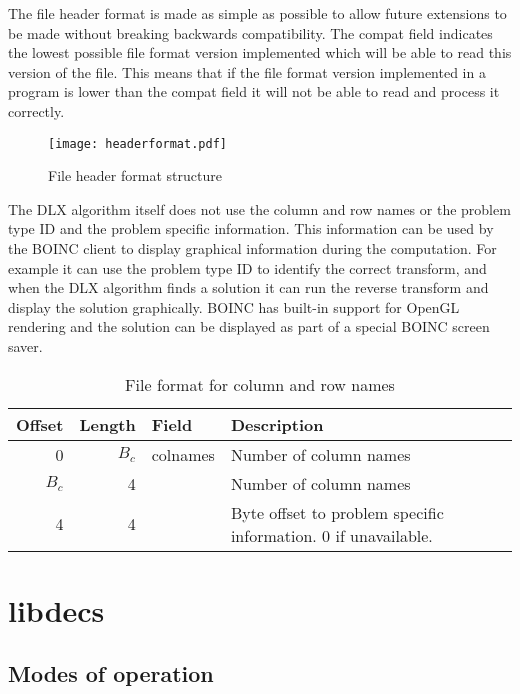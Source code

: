 The file header format is made as simple as possible to allow future extensions to be made without breaking backwards compatibility.
The compat field indicates the lowest possible file format version implemented which will be able to read this version of the file.
This means that if the file format version implemented in a program is lower than the compat field it will not be able to read and process it correctly.

\begin{figure}[htb]
	\centering
	\texttt{[image: headerformat.pdf]}
	\caption{File header format structure}
	\label{fig:header}
\end{figure}


The DLX algorithm itself does not use the column and row names or the problem type ID and the problem specific information.
This information can be used by the BOINC client to display graphical information during the computation.
For example it can use the problem type ID to identify the correct transform, and when the DLX algorithm finds a solution it can run the reverse transform and display the solution graphically.
BOINC has built-in support for OpenGL rendering and the solution can be displayed as part of a special BOINC screen saver.

\begin{table}[htbp]
	\centering
	\begin{tabular}{|r|r|l|p{2.6in}|}
		\hline
		\bf Offset & \bf Length & \bf Field & \bf Description \\ \hline
		0     & $B_c$ & colnames & Number of column names \\ \hline
		$B_c$ & 4     &  & Number of column names \\ \hline
		4     & 4     &   & Byte offset to problem specific information. 0 if unavailable. \\ \hline
	\end{tabular}
	\caption{File format for column and row names}
	\label{tab:colrowformat}
\end{table}



\section{libdecs}


\subsection{Modes of operation}

